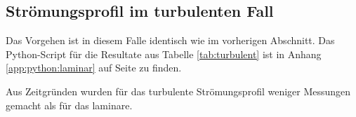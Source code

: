 \clearpage
\subsection{Str\"omungsprofil im turbulenten Fall}
\label{subsec:profil:turbulent}

Das Vorgehen ist  in diesem Falle identisch wie im  vorherigen Abschnitt.  Das
Python-Script  f\"ur  die Resultate  aus  Tabelle  \ref{tab:turbulent} ist  in
Anhang  \ref{app:python:laminar} auf  Seite \pageref{app:python:turbulent}  zu
finden.

Aus  Zeitgr\"unden  wurden  f\"ur  das  turbulente  Str\"omungsprofil  weniger
Messungen gemacht als f\"ur das laminare.

